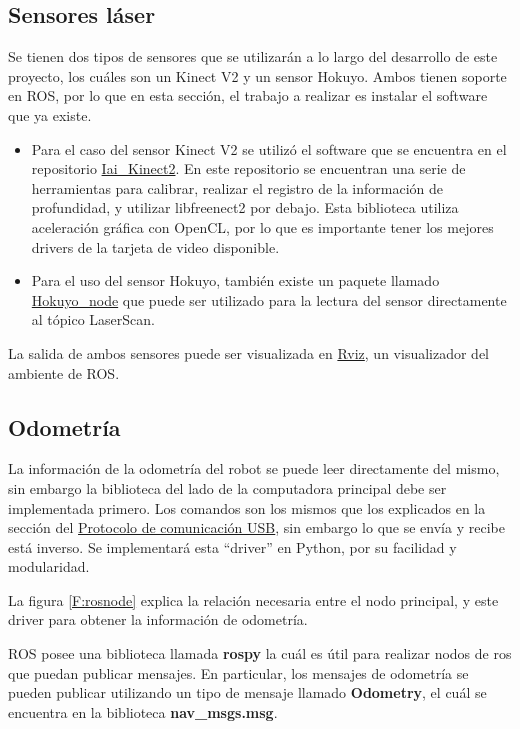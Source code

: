 \subsection{Sensores láser}

Se tienen dos tipos de sensores que se utilizarán a lo largo del desarrollo de este proyecto, los cuáles son un Kinect V2 y un sensor Hokuyo. Ambos tienen soporte en ROS, por lo que en esta sección, el trabajo a realizar es instalar el software que ya existe.

\begin{itemize}
\item Para el caso del sensor Kinect V2 se utilizó el software que se encuentra en el repositorio \href{https://github.com/code-iai/iai_kinect2}{Iai\_Kinect2}. En este repositorio se encuentran una serie de herramientas para calibrar, realizar el registro de la información de profundidad, y utilizar libfreenect2 por debajo. Esta biblioteca utiliza aceleración gráfica con OpenCL, por lo que es importante tener los mejores drivers de la tarjeta de video disponible.

\item Para el uso del sensor Hokuyo, también existe un paquete llamado \href{https://github.com/ros-drivers/hokuyo_node}{Hokuyo\_node} que puede ser utilizado para la lectura del sensor directamente al tópico LaserScan.
\end{itemize}

La salida de ambos sensores puede ser visualizada en \href{http://wiki.ros.org/rviz}{Rviz}, un visualizador del ambiente de ROS.

\subsection{Odometría}

\label{seccionodometria}

La información de la odometría del robot se puede leer directamente del mismo, sin embargo la biblioteca del lado de la computadora principal debe ser implementada primero. Los comandos son los mismos que los explicados en la sección del \hyperref[libreria]{Protocolo de comunicación USB}, sin embargo lo que se envía y recibe está inverso. Se implementará esta ``driver'' en Python, por su facilidad y modularidad.

La figura \ref{F:rosnode} explica la relación necesaria entre el nodo principal, y este driver para obtener la información de odometría.

ROS posee una biblioteca llamada \textbf{rospy} la cuál es útil para realizar nodos de ros que puedan publicar mensajes. En particular, los mensajes de odometría se pueden publicar utilizando un tipo de mensaje llamado \textbf{Odometry}, el cuál se encuentra en la biblioteca \textbf{nav\_msgs.msg}.

